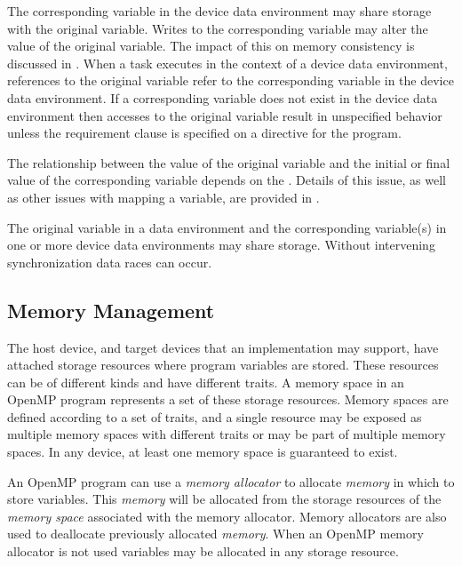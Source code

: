 The corresponding variable in the device data environment may share storage with the
original variable. Writes to the corresponding variable may alter the value of the original
variable. The impact of this on memory consistency is discussed in
.
When a task executes in the context of a device data environment, references to
the original variable refer to the corresponding variable in the device data environment.
If a corresponding variable does not exist in the device data
environment then accesses to the original variable result in
unspecified behavior unless the  requirement clause
is specified on a  directive for the program.

The relationship between the value of the original variable and the initial or final value
of the corresponding variable depends on the . Details of this issue, as well as
other issues with mapping a variable, are provided in .

The original variable in a data environment and the corresponding variable(s) in one or
more device data environments may share storage. Without intervening synchronization
data races can occur.

\subsection{Memory Management}
The host device, and target devices that an implementation may support, have attached storage resources where program variables are stored. These resources can be of different kinds and have different traits. A memory space in an OpenMP program represents a set of these storage resources. Memory spaces are defined according to a set of traits, and a single resource may be exposed as multiple memory spaces with different traits or may be part of multiple memory spaces. In any device, at least one memory space is guaranteed to exist.

An OpenMP program can use a \emph{memory allocator} to allocate \emph{memory} 
in which to store variables. This \emph{memory} will be allocated from the 
storage resources of the \emph{memory space} associated with the memory 
allocator. Memory allocators are also used to deallocate previously allocated
\emph{memory}. When an OpenMP memory allocator is not used variables may be 
allocated in any storage resource.


